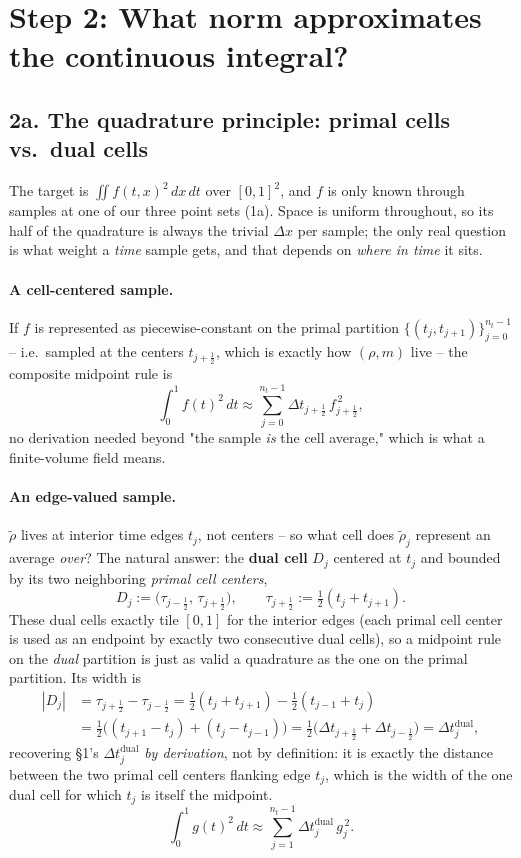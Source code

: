 \documentclass[11pt]{article}
\newcommand{\dt}{\Delta t}
\newcommand{\dx}{\Delta x}
\newcommand{\half}{\tfrac12}
\begin{document}
\section*{Step 2: What norm approximates the continuous integral?}

\subsection*{2a. The quadrature principle: primal cells vs.\ dual cells}

The target is $\iint f(t,x)^2\,dx\,dt$ over $[0,1]^2$, and $f$ is only known through samples at
one of our three point sets (1a). Space is uniform throughout, so its half of the quadrature is
always the trivial $\dx$ per sample; the only real question is what weight a \emph{time} sample
gets, and that depends on \emph{where in time} it sits.

\paragraph{A cell-centered sample.} If $f$ is represented as piecewise-constant on the primal
partition $\{(t_j,t_{j+1})\}_{j=0}^{n_t-1}$ -- i.e.\ sampled at the centers $t_{j+\half}$, which is
exactly how $(\rho,m)$ live -- the composite midpoint rule is
\[
  \int_0^1 f(t)^2\,dt \approx \sum_{j=0}^{n_t-1} \dt_{j+\half}\, f_{j+\half}^{\,2},
\]
no derivation needed beyond "the sample \emph{is} the cell average," which is what a finite-volume
field means.

\paragraph{An edge-valued sample.} $\tilde\rho$ lives at interior time edges $t_j$, not centers --
so what cell does $\tilde\rho_j$ represent an average \emph{over}? The natural answer: the
\textbf{dual cell} $D_j$ centered at $t_j$ and bounded by its two neighboring \emph{primal cell
centers},
\[
  D_j := \bigl(\tau_{j-\half},\,\tau_{j+\half}\bigr), \qquad \tau_{j+\half}:=\half(t_j+t_{j+1}).
\]
These dual cells exactly tile $[0,1]$ for the interior edges (each primal cell center is used as an
endpoint by exactly two consecutive dual cells), so a midpoint rule on the \emph{dual} partition is
just as valid a quadrature as the one on the primal partition. Its width is
\begin{align*}
  |D_j| &= \tau_{j+\half}-\tau_{j-\half}
  = \half(t_j+t_{j+1}) - \half(t_{j-1}+t_j) \\
  &= \half\bigl((t_{j+1}-t_j)+(t_j-t_{j-1})\bigr)
  = \half\bigl(\dt_{j+\half}+\dt_{j-\half}\bigr) = \dt_j^\mathrm{dual},
\end{align*}
recovering \S1's $\dt_j^\mathrm{dual}$ \emph{by derivation}, not by definition: it is exactly the
distance between the two primal cell centers flanking edge $t_j$, which is the width of the one
dual cell for which $t_j$ is itself the midpoint.
\[
  \int_0^1 g(t)^2\,dt \approx \sum_{j=1}^{n_t-1} \dt_j^\mathrm{dual}\, g_j^{\,2}.
\]
\end{document}
